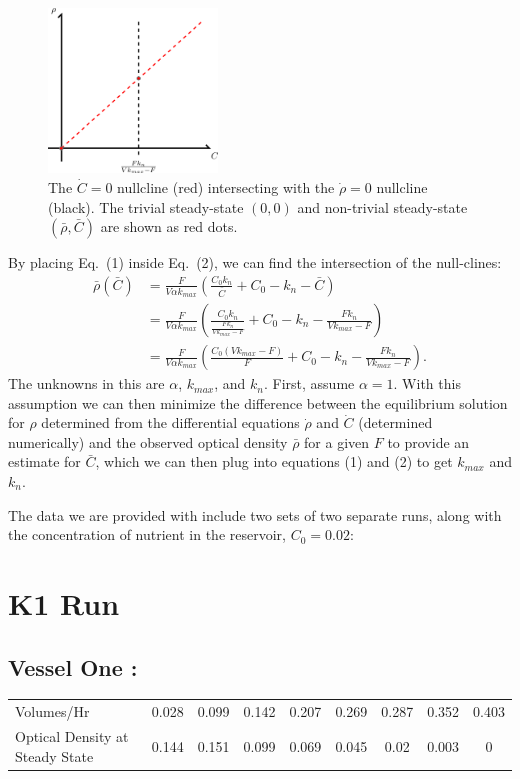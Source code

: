 \begin{multicols}{2}
\begin{figure}[H]
  \centering
    \includegraphics[width=0.40\textwidth]{images/drawing.png}
  \caption{\footnotesize The $\dot{C} = 0$ nullcline (red) intersecting with the $\dot{\rho} = 0$ nullcline (black).  The trivial steady-state $(0,0)$ and non-trivial steady-state $(\bar{\rho}, \bar{C})$ are shown as red dots.}
\end{figure}
\vfill
\columnbreak
By placing Eq.\ (1) inside Eq.\ (2), we can find the intersection of the null-clines:
\scriptsize
\begin{align*}
  \bar{\rho}(\bar{C}) &= \frac{F}{V \alpha k_{max}} \left( \frac{C_0 k_n}{\bar{C}} + C_0 - k_n - \bar{C} \right) \\
  &= \frac{F}{V \alpha k_{max}} \left( \frac{C_0 k_n}{\frac{F k_n}{V k_{max} - F}} + C_0 - k_n - \frac{F k_n}{V k_{max} - F} \right) \\
  &= \frac{F}{V \alpha k_{max}} \left( \frac{C_0(V k_{max} - F)}{F} + C_0 - k_n - \frac{F k_n}{V k_{max} - F} \right).
\end{align*}
\small
The unknowns in this are $\alpha$, $k_{max}$, and $k_n$.  First, assume $\alpha = 1$.  With this assumption we can then minimize the difference between the equilibrium solution for $\rho$ determined from the differential equations $\dot{\rho}$ and $\dot{C}$ (determined numerically) and the observed optical density $\bar{\rho}$ for a given $F$ to provide an estimate for $\bar{C}$, which we can then plug into equations (1) and (2) to get $k_{max}$ and $k_n$.
\end{multicols}

The data we are provided with include two sets of two separate runs, along with the concentration of nutrient in the reservoir, $C_0 = 0.02$:
\section{K1 Run}
\subsection*{Vessel One :}
\begin{center}
\begin{tabular}{l|cccccccc}
  Volumes/Hr & 0.028 & 0.099 & 0.142 & 0.207 & 0.269 & 0.287 & 0.352 & 0.403 \\
  Optical Density at Steady State & 0.144 & 0.151 & 0.099 & 0.069 & 0.045 & 0.02 & 0.003 & 0 \\
\end{tabular}
\end{center}


